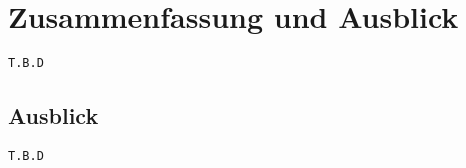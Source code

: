 \chapter{Zusammenfassung und Ausblick}
\label{chap:zusfas}
\texttt{T.B.D}

\section*{Ausblick}
\texttt{T.B.D}
